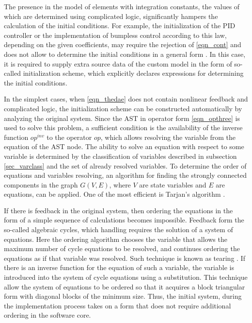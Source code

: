 \documentclass[lettersize,journal]{IEEEtran}
\begin{document}
The presence in the model of elements with integration constants, the values of which are determined using complicated logic,
significantly hampers the calculation of the initial conditions. For example, the initialization of the PID controller or the
implementation of bumpless control according to this law, depending on the given coefficients, may require the rejection of 
\eqref{eqn_cont} and does not allow to determine the initial conditions in a general form \cite{fabozzi17}. In this case, 
it is required to supply extra source data of the custom model in the form of so-called initialization scheme, which explicitly
declares expressions for determining the initial conditions.

In the simplest cases, when \eqref{eqn_thedae} does not contain nonlinear feedback and complicated logic, the initialization scheme can be constructed automatically by analyzing the original system. 
Since the AST in operator form \eqref{eqn_opthree} is used to solve this problem, a sufficient condition is the availability of the inverse 
function \(op^{inv}\) to the operator \(op\), which allows resolving the variable from the equation of the AST node. 
The ability to solve an equation with respect to some variable is determined by the classification of variables described in
subsection \ref{sec_varclass} and the set of already resolved variables. To determine the order of equations and variables resolving, 
an algorithm for finding the strongly connected components in the graph \(G(V,E)\), where \(V\) are state variables and \(E\) 
are equations, can be applied. One of the most efficient is Tarjan's algorithm \cite{sedgwwick11}.

If there is feedback in the original system, then ordering the equations in the form of a simple sequence of calculations
becomes impossible. Feedback form the so-called algebraic cycles, which handling requires the solution of a system of
equations. Here the ordering algorithm chooses the variable that allows the maximum number of cycle equations to be
resolved, and continues ordering the equations as if that variable was resolved. Such technique is known as tearing \cite{cellier}. If there is an inverse function for the
equation of such a variable, the variable is introduced into the system of cycle equations using a substitution. 
This technique allow the system of equations to be ordered so that it acquires a block triangular form with diagonal blocks of 
the minimum size. Thus, the initial system, during the implementation process takes on a form that does not require additional 
ordering in the software core.
\end{document}
